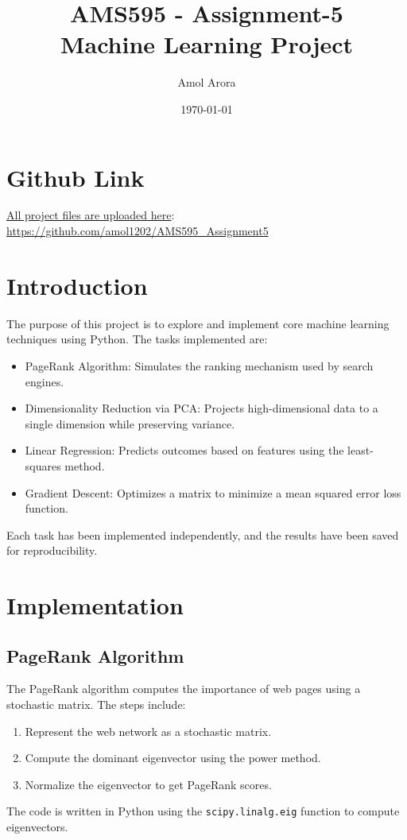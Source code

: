\documentclass[a4paper,12pt]{article}
\title{\textbf{AMS595 - Assignment-5}\\ \large Machine Learning Project}
\author{Amol Arora}
\date{\today}
\begin{document}
\maketitle

\section{Github Link}
\underline{All project files are uploaded here}:
\url{https://github.com/amol1202/AMS595_Assignment5}

\section{Introduction}
The purpose of this project is to explore and implement core machine learning techniques using Python. The tasks implemented are:
\begin{itemize}
    \item PageRank Algorithm: Simulates the ranking mechanism used by search engines.
    \item Dimensionality Reduction via PCA: Projects high-dimensional data to a single dimension while preserving variance.
    \item Linear Regression: Predicts outcomes based on features using the least-squares method.
    \item Gradient Descent: Optimizes a matrix to minimize a mean squared error loss function.
\end{itemize}

Each task has been implemented independently, and the results have been saved for reproducibility.

\section{Implementation}

\subsection{PageRank Algorithm}
The PageRank algorithm computes the importance of web pages using a stochastic matrix. The steps include:
\begin{enumerate}
    \item Represent the web network as a stochastic matrix.
    \item Compute the dominant eigenvector using the power method.
    \item Normalize the eigenvector to get PageRank scores.
\end{enumerate}
The code is written in Python using the \texttt{scipy.linalg.eig} function to compute eigenvectors.
\end{document}
